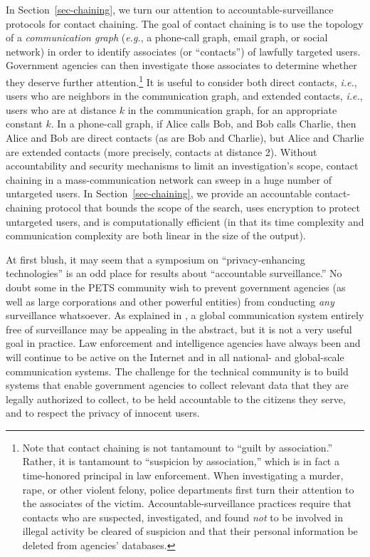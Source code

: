In Section~\ref{sec-chaining}, we turn our attention to 
accountable-surveillance protocols for contact chaining.
The goal of contact chaining is to use the topology of a {\it communication 
graph} ({\it e.g.}, a phone-call graph, email graph, or social network) 
in order to identify associates (or ``contacts'') of lawfully targeted users. 
Government agencies can then investigate those associates to determine whether
they deserve further attention.\footnote{Note that contact chaining is not
tantamount to ``guilt by association.''  Rather, it is tantamount to
``suspicion by association,'' which is in fact a time-honored principal in
law enforcement.  When investigating a murder, rape, or other violent felony,
police departments first turn their attention to the associates of the victim.
Accountable-surveillance practices require that contacts who are suspected,
investigated, and found {\it not} to be involved in illegal activity be 
cleared of suspicion and that their personal information be deleted from 
agencies' databases.} It is useful to consider both direct contacts, 
{\it i.e.}, users who are neighbors in the communication graph, and
extended contacts, {\it i.e.}, users who are at distance $k$ in the 
communication graph, for an appropriate constant $k$.
In a phone-call graph, if Alice calls Bob, 
and Bob calls Charlie, then Alice and Bob are direct contacts (as are Bob and 
Charlie), but Alice and Charlie are extended contacts (more precisely,
contacts at distance 2).  Without accountability and security mechanisms to
limit an investigation's scope, contact chaining in a mass-communication
network can sweep in a huge number of untargeted users.
In Section~\ref{sec-chaining}, we provide an accountable contact-chaining
protocol that bounds the scope of the search, uses encryption to protect 
untargeted users, and is computationally efficient (in that its time
complexity and communication complexity are both linear in the size of the 
output).

At first blush, it may seem that a symposium on ``privacy-enhancing 
technologies'' is an odd place for results about ``accountable surveillance.''
No doubt some in the PETS community wish to prevent government agencies 
(as well as large corporations and other powerful entities) from conducting 
{\it any} surveillance whatsoever.  As explained in \cite{sff-foci2014}, a 
global communication system entirely free of surveillance may be appealing in
the abstract, but it is not a very useful goal in practice.  Law enforcement
and intelligence agencies have always been and will continue to be active 
on the Internet and in all national- and global-scale communication systems.
The challenge for the technical community is to build systems that enable
government agencies to collect relevant data that they are legally authorized
to collect, to be held accountable to the citizens they serve, and to respect 
the privacy of innocent users.

